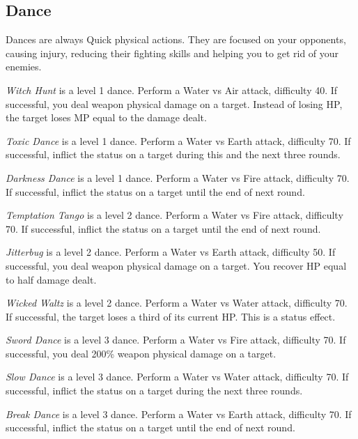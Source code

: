 \label{sec:performances}
\begin{multicols}{2}

    \subsection{Dance}
    \label{subsec:perf-dance}
    
    Dances are always Quick physical actions. They are focused on your opponents, causing injury, reducing their fighting skills and helping you to get rid of your enemies.
    
    \textit{Witch Hunt} is a level 1 dance. Perform a Water vs Air attack, difficulty 40. If successful, you deal weapon physical damage on a target. Instead of losing HP, the target loses MP equal to the damage dealt.
    
    \textit{Toxic Dance} is a level 1 dance. Perform a Water vs Earth attack, difficulty 70. If successful, inflict the  status on a target during this and the next three rounds.

    \textit{Darkness Dance} is a level 1 dance. Perform a Water vs Fire attack, difficulty 70. If successful, inflict the  status on a target until the end of next round.
    
    \textit{Temptation Tango} is a level 2 dance. Perform a Water vs Fire attack, difficulty 70. If successful, inflict the  status on a target until the end of next round.
    
    \textit{Jitterbug} is a level 2 dance. Perform a Water vs Earth attack, difficulty 50. If successful, you deal weapon physical damage on a target. You recover HP equal to half damage dealt.
    
    \textit{Wicked Waltz} is a level 2 dance. Perform a Water vs Water attack, difficulty 70. If successful, the target loses a third of its current HP. This is a  status effect.
    
    \textit{Sword Dance} is a level 3 dance. Perform a Water vs Fire attack, difficulty 70. If successful, you deal 200\% weapon physical damage on a target.
    
    \textit{Slow Dance} is a level 3 dance. Perform a Water vs Water attack, difficulty 70. If successful, inflict the  status on a target during the next three rounds.
    
    \textit{Break Dance} is a level 3 dance. Perform a Water vs Earth attack, difficulty 70. If successful, inflict the  status on a target until the end of next round.
    

\end{multicols}
